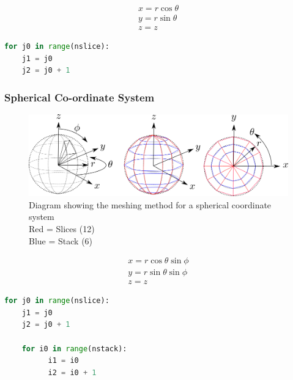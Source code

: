 \documentclass[12pt,a4paper]{article}
\begin{document}
\begin{equation}
\begin{split}
x = r \cos{\theta} \\
y = r \sin{\theta} \\
z = z
\end{split}
\end{equation}

\begin{lstlisting}[language=Python, caption=Python example]
for j0 in range(nslice):
    j1 = j0
    j2 = j0 + 1
\end{lstlisting}

\subsubsection{Spherical Co-ordinate System}
\begin{figure}[h!]
\centering
\includegraphics[scale=0.5]{Images//Coords//sph.png}
\caption[width=\columnwidth]{Diagram showing the meshing method for a spherical coordinate system\\
Red = Slices (12)\\
Blue = Stack (6)}
\label{conts}
\end{figure}

\begin{equation}
\begin{split}
x = r \cos{\theta}\sin{\phi}\\
y = r \sin{\theta}\sin{\phi} \\
z = z
\end{split}
\end{equation}

\begin{lstlisting}[language=Python, caption=Python example]
for j0 in range(nslice):
    j1 = j0
    j2 = j0 + 1

    for i0 in range(nstack):
          i1 = i0
          i2 = i0 + 1
\end{lstlisting}
\end{document}
